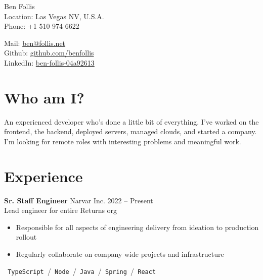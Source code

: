 \documentclass{res}
\begin{document}


{\huge Ben Follis}\\

Location: {Las Vegas NV, U.S.A.}\\
Phone: {+1 510 974 6622}\\
\vspace{-\baselineskip} %

Mail: {\href{mailto:ben@follis.net}{ben@follis.net}}\\
Github: {\href{https://github.com/benfollis}{github.com/benfollis}}\\
LinkedIn: {\href{https://www.linkedin.com/in/ben-follis-04a92613}{ben-follis-04a92613}}\\



\section{Who am I?}
An experienced developer who's done a little bit of everything.
I've worked on the frontend, the backend, deployed servers, managed clouds, and started a company.
I'm looking for remote roles with interesting problems and meaningful work.


\section{Experience}
        {\bf Sr. Staff Engineer} \hfill Narvar Inc. \hfill 2022 -- Present \\
        Lead engineer for entire Returns org
        \begin{itemize}
        \item Responsible for all aspects of engineering delivery from ideation to production rollout
        \item Regularly collaborate on company wide projects and infrastructure
        \end{itemize}
        
        \texttt{ TypeScript }\slash\texttt{ Node }\slash\texttt{ Java }\slash\texttt{ Spring }\slash\texttt{ React } \\
\end{document}
